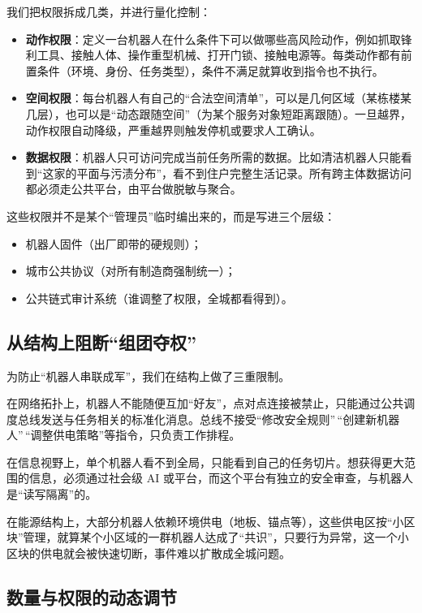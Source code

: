 我们把权限拆成几类，并进行量化控制：

\begin{itemize}
\item
  \textbf{动作权限}：定义一台机器人在什么条件下可以做哪些高风险动作，例如抓取锋利工具、接触人体、操作重型机械、打开门锁、接触电源等。每类动作都有前置条件（环境、身份、任务类型），条件不满足就算收到指令也不执行。
\item
  \textbf{空间权限}：每台机器人有自己的``合法空间清单''，可以是几何区域（某栋楼某几层），也可以是``动态跟随空间''（为某个服务对象短距离跟随）。一旦越界，动作权限自动降级，严重越界则触发停机或要求人工确认。
\item
  \textbf{数据权限}：机器人只可访问完成当前任务所需的数据。比如清洁机器人只能看到``这家的平面与污渍分布''，看不到住户完整生活记录。所有跨主体数据访问都必须走公共平台，由平台做脱敏与聚合。
\end{itemize}

这些权限并不是某个``管理员''临时编出来的，而是写进三个层级：

\begin{itemize}
\item
  机器人固件（出厂即带的硬规则）；
\item
  城市公共协议（对所有制造商强制统一）；
\item
  公共链式审计系统（谁调整了权限，全城都看得到）。
\end{itemize}

\subsection{从结构上阻断``组团夺权''}\label{ux4eceux7ed3ux6784ux4e0aux963bux65adux7ec4ux56e2ux593aux6743}

为防止``机器人串联成军''，我们在结构上做了三重限制。

在网络拓扑上，机器人不能随便互加``好友''，点对点连接被禁止，只能通过公共调度总线发送与任务相关的标准化消息。总线不接受``修改安全规则''\,``创建新机器人''\,``调整供电策略''等指令，只负责工作排程。

在信息视野上，单个机器人看不到全局，只能看到自己的任务切片。想获得更大范围的信息，必须通过社会级 AI 或平台，而这个平台有独立的安全审查，与机器人是``读写隔离''的。

在能源结构上，大部分机器人依赖环境供电（地板、锚点等），这些供电区按``小区块''管理，就算某个小区域的一群机器人达成了``共识''，只要行为异常，这一个小区块的供电就会被快速切断，事件难以扩散成全城问题。

\subsection{数量与权限的动态调节}\label{ux6570ux91cfux4e0eux6743ux9650ux7684ux52a8ux6001ux8c03ux8282}


